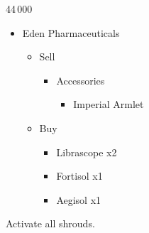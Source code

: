 \begin{multicols}{2}
	\begin{shop}{44\,000}
		\begin{itemize}
			\item Eden Pharmaceuticals
			      \begin{itemize}
				      \item Sell
				            \begin{itemize}
					            \item Accessories
					                  \begin{itemize}
						                  \item Imperial Armlet
					                  \end{itemize}
				            \end{itemize}
				      \item Buy
				            \begin{itemize}
					            \item Librascope x2
					            \item Fortisol x1
					            \item Aegisol x1
				            \end{itemize}
			      \end{itemize}
		\end{itemize}
	\end{shop}
	Activate all shrouds.
\end{multicols}

